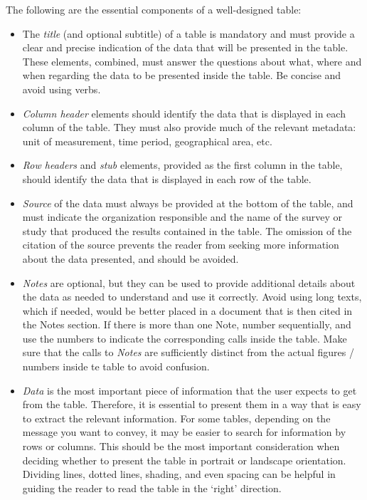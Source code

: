 \documentclass[
  12pt,
]{book}
\begin{document}
The following are the essential components of a well-designed table:

\begin{itemize}
\item
  The \emph{title} (and optional subtitle) of a table is mandatory and must provide a clear and precise indication of the data that will be presented in the table. These elements, combined, must answer the questions about what, where and when regarding the data to be presented inside the table. Be concise and avoid using verbs.
\item
  \emph{Column header} elements should identify the data that is displayed in each column of the table. They must also provide much of the relevant metadata: unit of measurement, time period, geographical area, etc.
\item
  \emph{Row headers} and \emph{stub} elements, provided as the first column in the table, should identify the data that is displayed in each row of the table.
\item
  \emph{Source} of the data must always be provided at the bottom of the table, and must indicate the organization responsible and the name of the survey or study that produced the results contained in the table. The omission of the citation of the source prevents the reader from seeking more information about the data presented, and should be avoided.
\item
  \emph{Notes} are optional, but they can be used to provide additional details about the data as needed to understand and use it correctly. Avoid using long texts, which if needed, would be better placed in a document that is then cited in the Notes section. If there is more than one Note, number sequentially, and use the numbers to indicate the corresponding calls inside the table. Make sure that the calls to \emph{Notes} are sufficiently distinct from the actual figures / numbers inside te table to avoid confusion.
\item
  \emph{Data} is the most important piece of information that the user expects to get from the table. Therefore, it is essential to present them in a way that is easy to extract the relevant information. For some tables, depending on the message you want to convey, it may be easier to search for information by rows or columns. This should be the most important consideration when deciding whether to present the table in portrait or landscape orientation. Dividing lines, dotted lines, shading, and even spacing can be helpful in guiding the reader to read the table in the `right' direction.
\end{itemize}
\end{document}
